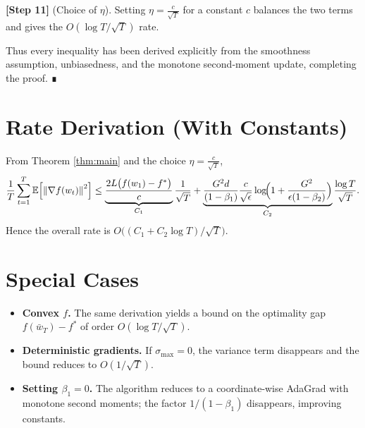 \documentclass{article}
\newcommand{\E}{\mathbb{E}}
\newcommand{\norm}[1]{\left\|#1\right\|}
\begin{document}
\noindent\textbf{[Step 11]} (Choice of $\eta$).  
Setting $\eta = \frac{c}{\sqrt{T}}$ for a constant $c$ balances the two terms and gives the $O(\log T/\sqrt{T})$ rate.

\bigskip
Thus every inequality has been derived explicitly from the smoothness assumption, unbiasedness, and the monotone second‑moment update, completing the proof. ∎

\section*{Rate Derivation (With Constants)}
From Theorem \ref{thm:main} and the choice $\eta = \frac{c}{\sqrt{T}}$,
\[
\frac{1}{T}\sum_{t=1}^{T}\E\!\left[\norm{\nabla f(w_t)}^{2}\right]
\le
\underbrace{\frac{2L\bigl(f(w_1)-f^{*}\bigr)}{c}}_{C_1}\frac{1}{\sqrt{T}}
+
\underbrace{\frac{G^{2}d}{(1-\beta_1)}\frac{c}{\sqrt{\epsilon}}
          \log\!\Bigl(1+\frac{G^{2}}{\epsilon(1-\beta_2)}\Bigr)}_{C_2}
\frac{\log T}{\sqrt{T}} .
\]
Hence the overall rate is $O\bigl((C_1+C_2\log T)/\sqrt{T}\bigr)$.

\section*{Special Cases}
\begin{itemize}
\item \textbf{Convex $f$.} The same derivation yields a bound on the optimality gap $f(\bar w_T)-f^{*}$ of order $O(\log T/\sqrt{T})$.
\item \textbf{Deterministic gradients.} If $\sigma_{\max}=0$, the variance term disappears and the bound reduces to $O(1/\sqrt{T})$.
\item \textbf{Setting $\beta_1=0$.} The algorithm reduces to a coordinate‑wise AdaGrad with monotone second moments; the factor $1/(1-\beta_1)$ disappears, improving constants.
\end{itemize}
\end{document}
